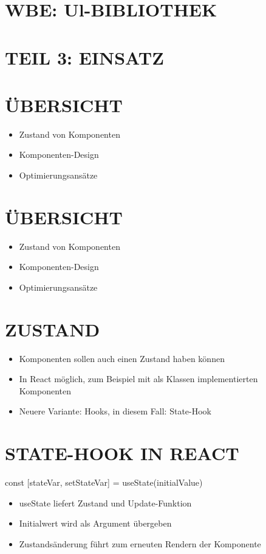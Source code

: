 \documentclass[10pt]{article}
\author{Articles\\
Title Summary\\
- Article 1 X\\
Article 1 Summary\\
- Article $2 \boldsymbol{X}$\\
- Article $3 \boldsymbol{X}$\\
- Article $4 \underline{X}$}
\date{}
\begin{document}
\maketitle
\section*{WBE: Ul-BIBLIOTHEK}
\section*{TEIL 3: EINSATZ}
\section*{ÜBERSICHT}
\begin{itemize}
  \item Zustand von Komponenten
  \item Komponenten-Design
  \item Optimierungsansätze
\end{itemize}

\section*{ÜBERSICHT}
\begin{itemize}
  \item Zustand von Komponenten
  \item Komponenten-Design
  \item Optimierungsansätze
\end{itemize}

\section*{ZUSTAND}
\begin{itemize}
  \item Komponenten sollen auch einen Zustand haben können
  \item In React möglich, zum Beispiel mit als Klassen implementierten Komponenten
  \item Neuere Variante: Hooks, in diesem Fall: State-Hook
\end{itemize}

\section*{STATE-HOOK IN REACT}
const [stateVar, setStateVar] = useState(initialValue)

\begin{itemize}
  \item useState liefert Zustand und Update-Funktion
  \item Initialwert wird als Argument übergeben
  \item Zustandsänderung führt zum erneuten Rendern der Komponente
\end{itemize}
\end{document}
